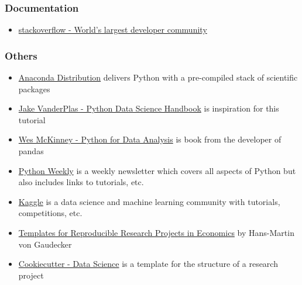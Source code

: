 \begin{frame}[c]\frametitle{Documentation}
\begin{itemize}
    \item \href{https://stackoverflow.com/}{stackoverflow - World's largest developer community}
\end{itemize}
\end{frame}

\begin{frame}[c]\frametitle{Others}
\begin{itemize}
    \item \href{https://www.anaconda.com/download/}{Anaconda Distribution} delivers Python with a pre-compiled stack of scientific packages
    \item \href{https://jakevdp.github.io/PythonDataScienceHandbook/}{Jake VanderPlas - Python Data Science Handbook} is inspiration for this tutorial
    \item \href{https://www.amazon.de/Python-Data-Analysis-Wrangling-IPython/dp/1491957662/}{Wes McKinney - Python for Data Analysis} is book from the developer of pandas
    \item \href{https://www.pythonweekly.com/}{Python Weekly} is a weekly newsletter which covers all aspects of Python but also includes links to tutorials, etc.
    \item \href{https://www.kaggle.com/}{Kaggle} is a data science and machine learning community with tutorials, competitions, etc.
    \item \href{https://github.com/hmgaudecker/econ-project-templates}{Templates for Reproducible Research Projects in Economics} by Hans-Martin von Gaudecker
    \item \href{https://drivendata.github.io/cookiecutter-data-science/}{Cookiecutter - Data Science} is a template for the structure of a research project
\end{itemize}
\end{frame}

